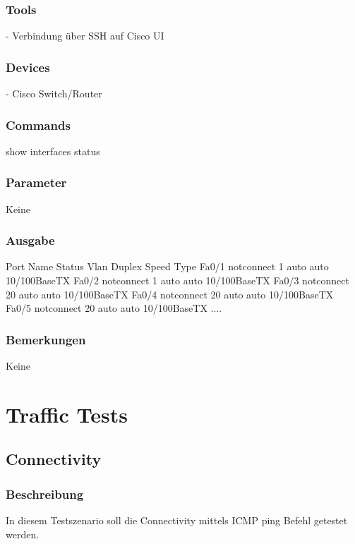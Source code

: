 \documentclass[a4,12pt]{scrartcl}
\begin{document}
\subsubsection{Tools}
- Verbindung über SSH auf Cisco UI
\subsubsection{Devices}
- Cisco Switch/Router
\subsubsection{Commands}
show interfaces status
\subsubsection{Parameter}
Keine
\subsubsection{Ausgabe}
Port      Name               Status       Vlan       Duplex  Speed Type\newline
Fa0/1                        notconnect   1            auto   auto 10/100BaseTX\newline
Fa0/2                        notconnect   1            auto   auto 10/100BaseTX\newline
Fa0/3                        notconnect   20           auto   auto 10/100BaseTX\newline
Fa0/4                        notconnect   20           auto   auto 10/100BaseTX\newline
Fa0/5                        notconnect   20           auto   auto 10/100BaseTX\newline
....\newline
\subsubsection{Bemerkungen}
Keine

\newpage
\section{Traffic Tests}
\subsection{Connectivity}
\subsubsection{Beschreibung}
In diesem Testszenario soll die Connectivity mittels ICMP ping Befehl getestet werden.
\end{document}

